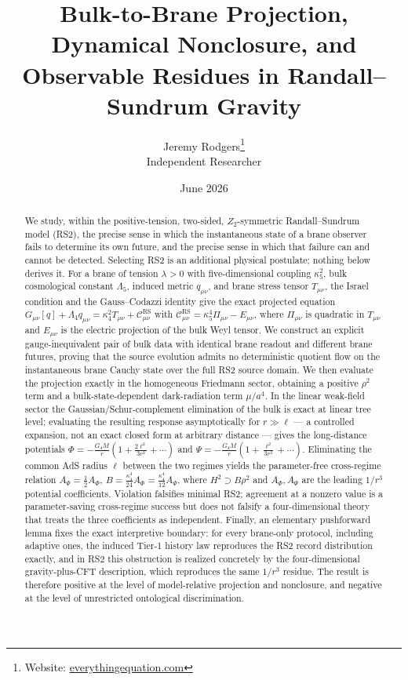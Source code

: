 \documentclass[11pt,a4paper]{article}
\title{\bf Bulk-to-Brane Projection, Dynamical Nonclosure, and Observable
Residues in Randall--Sundrum Gravity}
\author{%
  Jeremy Rodgers\thanks{Website: \href{https://everythingequation.com}{everythingequation.com}}\\
  \small Independent Researcher
}
\date{June 2026}
\theoremstyle{plain}
\theoremstyle{definition}
\newcommand{\kfive}{\kappa_5}
\newcommand{\kfour}{\kappa_4}
\newcommand{\Lfive}{\Lambda_5}
\newcommand{\Lfour}{\Lambda_4}
\newcommand{\RS}{\mathrm{RS}}
\begin{document}
\maketitle

\begin{abstract}
We study, within the positive-tension, two-sided, $Z_2$-symmetric
Randall--Sundrum model (RS2), the precise sense in which the
instantaneous state of a brane observer fails to determine its own
future, and the precise sense in which that failure can and cannot be
detected. Selecting RS2 is an additional physical postulate; nothing
below derives it. For a brane of tension $\lambda>0$ with
five-dimensional coupling $\kfive^2$, bulk cosmological constant
$\Lfive$, induced metric $q_{\mu\nu}$, and brane stress tensor
$T_{\mu\nu}$, the Israel condition and the Gauss--Codazzi identity give
the exact projected equation
$G_{\mu\nu}[q]+\Lfour q_{\mu\nu}=\kfour^2T_{\mu\nu}
+\mathcal C^{\RS}_{\mu\nu}$ with
$\mathcal C^{\RS}_{\mu\nu}=\kfive^4\Pi_{\mu\nu}-E_{\mu\nu}$,
where $\Pi_{\mu\nu}$ is quadratic in $T_{\mu\nu}$ and $E_{\mu\nu}$ is
the electric projection of the bulk Weyl tensor. We construct an
explicit gauge-inequivalent pair of bulk data with identical brane
readout and different brane futures, proving that the source evolution
admits no deterministic quotient flow on the instantaneous brane Cauchy
state over the full RS2 source domain. We then evaluate the projection
exactly in the homogeneous Friedmann sector, obtaining a positive
$\rho^2$ term and a bulk-state-dependent dark-radiation term $\mu/a^4$.
In the linear weak-field sector the Gaussian/Schur-complement elimination
of the bulk is exact at linear tree level; evaluating the resulting
response asymptotically for $r\gg\ell$ --- a controlled expansion, not an
exact closed form at arbitrary distance --- gives the long-distance
potentials
$\Phi=-\tfrac{G_4M}{r}(1+\tfrac{2\ell^2}{3r^2}+\cdots)$ and
$\Psi=-\tfrac{G_4M}{r}(1+\tfrac{\ell^2}{3r^2}+\cdots)$.
Eliminating the common AdS radius $\ell$ between the two regimes yields
the parameter-free cross-regime relation
$A_\Psi=\tfrac12A_\Phi$, $B=\tfrac{\kfour^4}{24}A_\Phi
=\tfrac{\kfour^4}{12}A_\Psi$,
where $H^2\supset B\rho^2$ and $A_\Phi,A_\Psi$ are the leading $1/r^3$
potential coefficients. Violation falsifies minimal RS2; agreement at a
nonzero value is a parameter-saving cross-regime success but does not
falsify a four-dimensional theory that treats the three coefficients as
independent. Finally, an elementary pushforward lemma fixes the exact
interpretive boundary: for every brane-only protocol, including adaptive
ones, the induced Tier-1 history law reproduces the RS2 record
distribution exactly, and in RS2 this
obstruction is realized concretely by the four-dimensional
gravity-plus-CFT description, which reproduces the same $1/r^3$
residue. The result is therefore positive at the level of model-relative
projection and nonclosure, and negative at the level of unrestricted
ontological discrimination.
\end{abstract}
\end{document}
